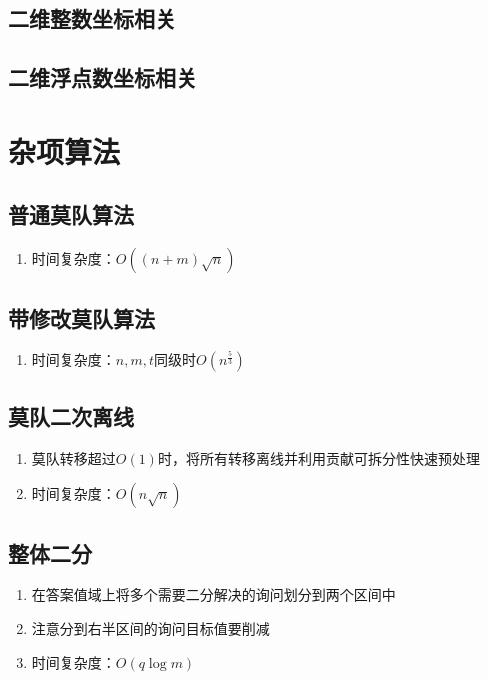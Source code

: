 \documentclass[twocolumn,a4,8pt]{article}  %
\begin{document}
		\subsection{二维整数坐标相关}
	 	 	
	 	 	
		\subsection{二维浮点数坐标相关}
	 	 	
	
	\section{杂项算法}
		\subsection{普通莫队算法}
			\noindent\begin{enumerate}
				\item 时间复杂度：$O((n+m)\sqrt{n})$
			\end{enumerate}
	 	 	
	 	 	
	 	\subsection{带修改莫队算法}
			\noindent\begin{enumerate}
				\item 时间复杂度：$n,m,t$同级时$O(n^{\frac{5}{3}})$
			\end{enumerate}
	 	 	
	 	 	
	 	\subsection{莫队二次离线}
			\noindent\begin{enumerate}
				\item 莫队转移超过$O(1)$时，将所有转移离线并利用贡献可拆分性快速预处理
				\item 时间复杂度：$O(n\sqrt{n})$
			\end{enumerate}
	 	 	
	 	 	
	 	\subsection{整体二分}
			\noindent\begin{enumerate}
				\item 在答案值域上将多个需要二分解决的询问划分到两个区间中
				\item 注意分到右半区间的询问目标值要削减
				\item 时间复杂度：$O(q\log m)$
			\end{enumerate}
	 	 	
	 	 	
\end{document}
